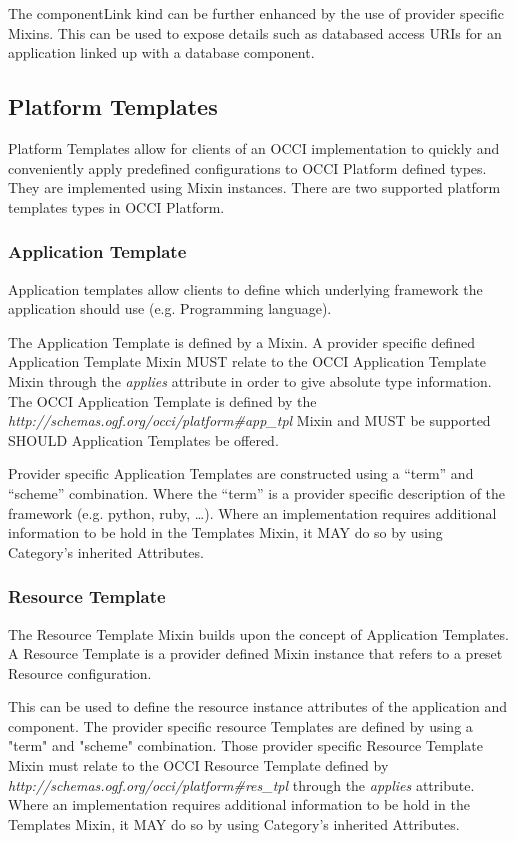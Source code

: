 \documentclass[10pt,a4paper]{article}
\begin{document}
The componentLink kind can be further enhanced by the use of  provider specific Mixins. This can be used to expose details such as databased access URIs for an application linked up with a database component.

\subsection{Platform Templates}
Platform Templates allow for clients of an OCCI implementation to quickly and conveniently apply predefined configurations to OCCI Platform defined types. They are implemented using Mixin instances. There are two supported platform templates types in OCCI Platform.

\subsubsection{Application Template}
Application templates allow clients to define which underlying framework the application should use (e.g. Programming language).

The Application Template is defined by a Mixin. A provider specific defined Application Template Mixin MUST relate to the OCCI Application Template Mixin through the \textit{applies} attribute in order to give absolute type information. The OCCI Application Template is defined by the \textit{http://schemas.ogf.org/occi/platform\#app\_tpl} Mixin and MUST be supported SHOULD Application Templates be offered.

Provider specific Application Templates are constructed using a “term” and “scheme” combination. Where the “term” is a provider specific description of the framework (e.g. python, ruby, …). Where an implementation requires additional information to be hold in the Templates Mixin, it MAY do so by using Category’s inherited Attributes.

\subsubsection{Resource Template}
The Resource Template Mixin builds upon the concept of Application Templates. A Resource Template is a provider defined Mixin instance that refers to a preset Resource configuration.

This can be used to define the resource instance attributes of the application and component. The provider specific resource Templates are defined by using a "term" and "scheme" combination. Those provider specific Resource Template Mixin must relate to the OCCI Resource Template defined by \textit{http://schemas.ogf.org/occi/platform\#res\_tpl} through the \textit{applies} attribute. Where an implementation requires additional information to be hold in the Templates Mixin, it MAY do so by using Category’s inherited Attributes.
\end{document}

